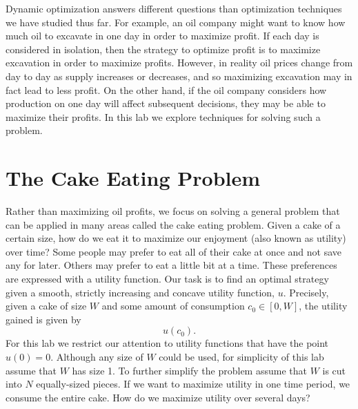 \label{lab:dynamic_optimization}


Dynamic optimization answers different questions than optimization techniques we have studied thus far.
For example, an oil company might want to know how much oil to excavate in one day in order to maximize profit.
If each day is considered in isolation, then the strategy to optimize profit is to maximize excavation in order to maximize profits.
However, in reality oil prices change from day to day as supply increases or decreases, and so maximizing excavation may in fact lead to less profit.
On the other hand, if the oil company considers how production on one day will affect subsequent decisions, they may be able to maximize their profits.
In this lab we explore techniques for solving such a problem.

\section*{The Cake Eating Problem}

Rather than maximizing oil profits, we focus on solving a general problem that can be applied in many areas called the cake eating problem.
Given a cake of a certain size, how do we eat it to maximize our enjoyment (also known as utility) over time?
Some people may prefer to eat all of their cake at once and not save any for later.
Others may prefer to eat a little bit at a time.
These preferences are expressed with a utility function.
Our task is to find an optimal strategy given a smooth, strictly increasing  and concave utility function, $u$.
Precisely, given a cake of size $W$ and some amount of consumption $c_0 \in [0, W]$, the utility gained is given by
\[
u(c_0).
\]
For this lab we restrict our attention to utility functions that have the point $u(0) = 0$.
Although any size of $W$ could be used, for simplicity of this lab assume that $W$ has size 1.
To further simplify the problem assume that $W$ is cut into $N$ equally-sized pieces.
If we want to maximize utility in one time period, we consume the entire cake.  How do we maximize utility over several days?

